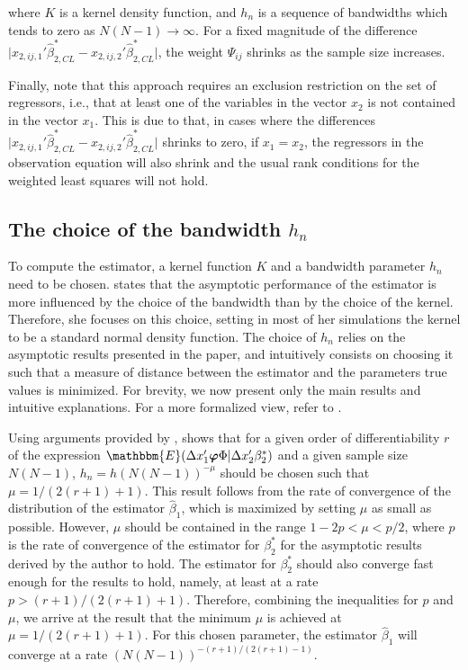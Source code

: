 \noindent where $K$ is a kernel density function, and $h_n$ is a sequence of bandwidths which tends to zero as $N(N-1) \xrightarrow{} \infty$. For a fixed magnitude of the difference $\rvert x_{2,ij,1}'{\hat{\beta}_{2,CL}^*} - x_{2,ij,2}'{\hat{\beta}_{2,CL}^*} \rvert$, the weight $\hat{\Psi}_{ij}$ shrinks as the sample size increases.

Finally, note that this approach requires an exclusion restriction on the set of regressors, i.e., that at least one of the variables in the vector $x_2$ is not contained in the vector $x_1$. This is due to that, in cases where the differences $\rvert x_{2,ij,1}'{\hat{\beta}_{2,CL}^*} - x_{2,ij,2}'{\hat{\beta}_{2,CL}^*} \rvert$ shrinks to zero, if $x_1 = x_2$, the regressors in the observation equation will also shrink and the usual rank conditions for the weighted least squares will not hold.

\subsection{The choice of the bandwidth $h_n$} \label{bandwidth}
To compute the estimator, a kernel function $K$ and a bandwidth parameter $h_n$ need to be chosen. \cite{kyriazidou1997estimation} states that the asymptotic performance of the estimator is more influenced by the choice of the bandwidth than by the choice of the kernel. Therefore, she focuses on this choice, setting in most of her simulations the kernel to be a standard normal density function. The choice of $h_n$ relies on the asymptotic results presented in the paper, and intuitively consists on choosing it such that a measure of distance between the estimator and the parameters true values is minimized. For brevity, we now present only the main results and intuitive explanations. For a more formalized view, refer to \cite{kyriazidou1997estimation}.

Using arguments provided by \cite{bierens1987kernel}, \cite{kyriazidou1997estimation} shows that for a given order of differentiability $r$ of the expression $\mathbbm{E}(\Delta x_1' \bm{\varphi} \Phi \rvert \Delta x_2'\beta_2^*)$ and a given sample size $N(N-1)$, $h_n=h (N(N-1))^{-\mu}$ should be chosen such that $\mu = 1/(2 (r+1) +1)$. This result follows from the rate of convergence of the distribution of the estimator $\hat{\beta}_1$, which is maximized by setting $\mu$ as small as possible. However, $\mu$ should be contained in the range $1-2p < \mu < p/2$, where $p$ is the rate of convergence of the estimator for $\beta_2^*$ for the asymptotic results derived by the author to hold. The estimator for $\beta_2^*$ should also converge fast enough for the results to hold, namely, at least at a rate $p> (r+1)/(2(r+1)+1)$. Therefore, combining the inequalities for $p$ and $\mu$, we arrive at the result that the minimum $\mu$ is achieved at $\mu = 1/(2 (r+1) +1)$. For this chosen parameter, the estimator $\hat{\beta}_1$ will converge at a rate $(N(N-1))^{-(r+1)/(2(r+1)-1)}$.

